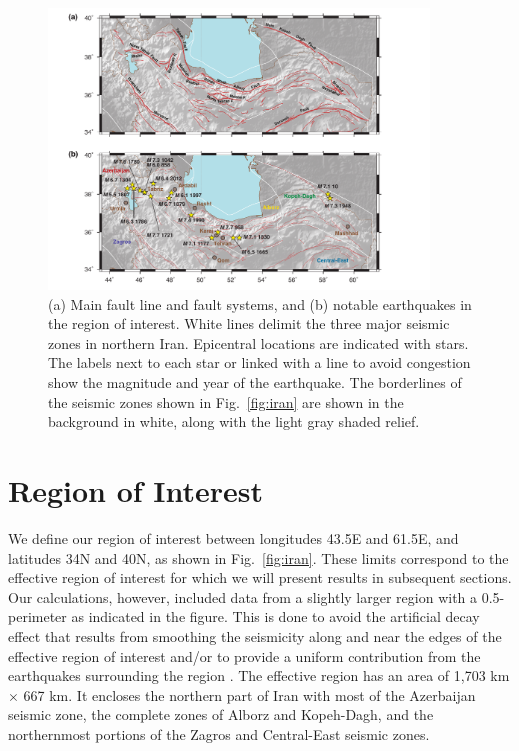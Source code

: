 \begin{figure}[t] 
	\centering
	\includegraphics[width=0.9\textwidth]{figures/pdf/figure-02}
	\caption{(a) Main fault line and fault systems, and (b) notable earthquakes in the region of interest. White lines delimit the three major seismic zones in northern Iran. Epicentral locations are indicated with stars. The labels next to each star or linked with a line to avoid congestion show the magnitude and year of the earthquake. The borderlines of the seismic zones shown in Fig.~\ref{fig:iran} are shown in the background in white, along with the light gray shaded relief.}
	\label{fig:selected}
\end{figure}

\section{Region of Interest}

We define our region of interest between longitudes 43.5\textdegree{}E and 61.5\textdegree{}E, and latitudes 34\textdegree{}N and 40\textdegree{}N, as shown in Fig.~\ref{fig:iran}. These limits correspond to the effective region of interest for which we will present results in subsequent sections. Our calculations, however, included data from a slightly larger region with a 0.5\textdegree{}-perimeter as indicated in the figure. This is done to avoid the artificial decay effect that results from smoothing the seismicity along and near the edges of the effective region of interest and/or to provide a uniform contribution from the earthquakes surrounding the region \citep[see][]{Lapajne1997}. The effective region has an area of 1,703 km $\times$ 667 km. It encloses the northern part of Iran with most of the Azerbaijan seismic zone, the complete zones of Alborz and Kopeh-Dagh, and the northernmost portions of the Zagros and Central-East seismic zones.

